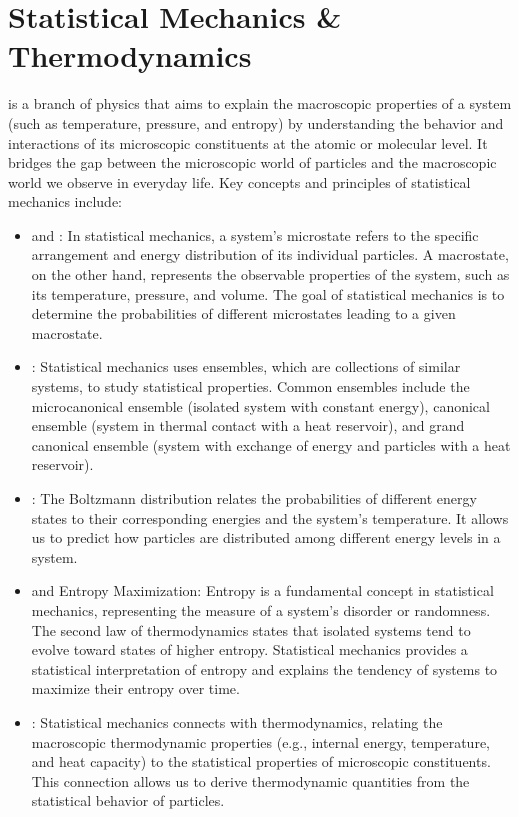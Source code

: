 \chapter{Statistical Mechanics \& Thermodynamics}
\thispagestyle{fancy}

 is a branch of physics that aims to explain the macroscopic properties of a system (such as temperature, pressure, and entropy) by understanding the behavior and interactions of its microscopic constituents at the atomic or molecular level. It bridges the gap between the microscopic world of particles and the macroscopic world we observe in everyday life. Key concepts and principles of statistical mechanics include:

\begin{itemize} 
	\item {} and : In statistical mechanics, a system's microstate refers to the specific arrangement and energy distribution of its individual particles. A macrostate, on the other hand, represents the observable properties of the system, such as its temperature, pressure, and volume. The goal of statistical mechanics is to determine the probabilities of different microstates leading to a given macrostate.
	
	\item {}: Statistical mechanics uses ensembles, which are collections of similar systems, to study statistical properties. Common ensembles include the microcanonical ensemble (isolated system with constant energy), canonical ensemble (system in thermal contact with a heat reservoir), and grand canonical ensemble (system with exchange of energy and particles with a heat reservoir).
	
	\item {}: The Boltzmann distribution relates the probabilities of different energy states to their corresponding energies and the system's temperature. It allows us to predict how particles are distributed among different energy levels in a system.
	
	\item {} and Entropy Maximization: Entropy is a fundamental concept in statistical mechanics, representing the measure of a system's disorder or randomness. The second law of thermodynamics states that isolated systems tend to evolve toward states of higher entropy. Statistical mechanics provides a statistical interpretation of entropy and explains the tendency of systems to maximize their entropy over time.
	
	\item {}: Statistical mechanics connects with thermodynamics, relating the macroscopic thermodynamic properties (e.g., internal energy, temperature, and heat capacity) to the statistical properties of microscopic constituents. This connection allows us to derive thermodynamic quantities from the statistical behavior of particles.
\end{itemize}

